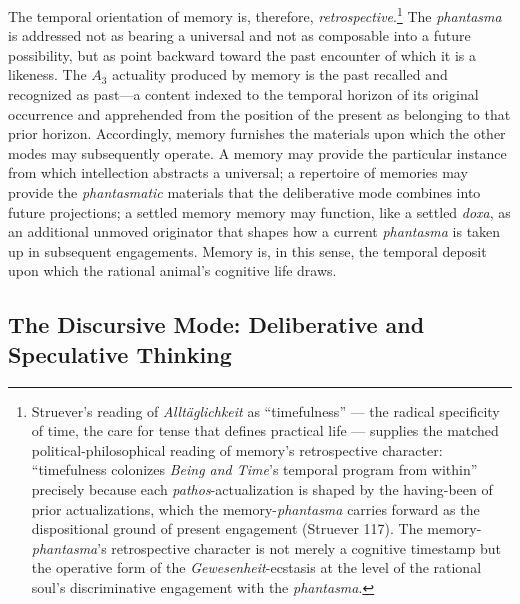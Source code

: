 \documentclass{article}
\begin{document}
The temporal orientation of memory is, therefore, \textit{retrospective}.\footnote{Struever's reading of \textit{Alltäglichkeit} as ``timefulness'' --- the radical specificity of time, the care for tense that defines practical life --- supplies the matched political-philosophical reading of memory's retrospective character: ``timefulness colonizes \textit{Being and Time}'s temporal program from within'' precisely because each \textit{pathos}-actualization is shaped by the having-been of prior actualizations, which the memory-\textit{phantasma} carries forward as the dispositional ground of present engagement (Struever 117). The memory-\textit{phantasma}'s retrospective character is not merely a cognitive timestamp but the operative form of the \textit{Gewesenheit}-ecstasis at the level of the rational soul's discriminative engagement with the \textit{phantasma}.} The \textit{phantasma} is addressed not as bearing a universal and not as composable into a future possibility, but as point backward toward the past encounter of which it is a likeness. The $A_3$ actuality produced by memory is the past recalled and recognized as past---a content indexed to the temporal horizon of its original occurrence and apprehended from the position of the present as belonging to that prior horizon. Accordingly, memory furnishes the materials upon which the other modes may subsequently operate. A memory may provide the particular instance from which intellection abstracts a universal; a repertoire of memories may provide the \textit{phantasmatic} materials that the deliberative mode combines into future projections; a settled memory memory may function, like a settled \textit{doxa}, as an additional unmoved originator that shapes how a current \textit{phantasma} is taken up in subsequent engagements. Memory is, in this sense, the temporal deposit upon which the rational animal's cognitive life draws. 

\subsection{The Discursive Mode: Deliberative and Speculative Thinking}
\end{document}
